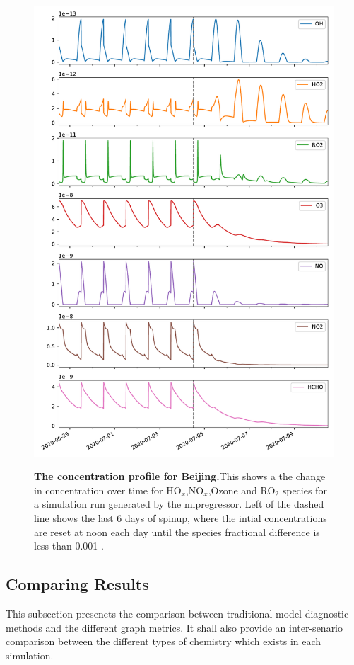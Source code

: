 \begin{figure}[H]
    \centering
\includegraphics[width=.9\textwidth]{figures_c3/mlpregressor/conc_beijing.pdf}
\label{fig:cbeijing}
\caption{\textbf{The concentration profile for Beijing.}This shows a the change in concentration over time for HO$_x$,NO$_x$,Ozone and RO$_2$ species for a simulation run generated by the mlpregressor. Left of the dashed line shows the last 6 days of spinup, where the intial concentrations are reset at noon each day until the species fractional difference is less than 0.001 .}
\end{figure}

\newpage





\subsection{Comparing Results}
This subsection presenets the comparison between traditional model diagnostic methods and the different graph metrics. It shall also provide an inter-senario comparison between the different types of chemistry which exists in each simulation. 

